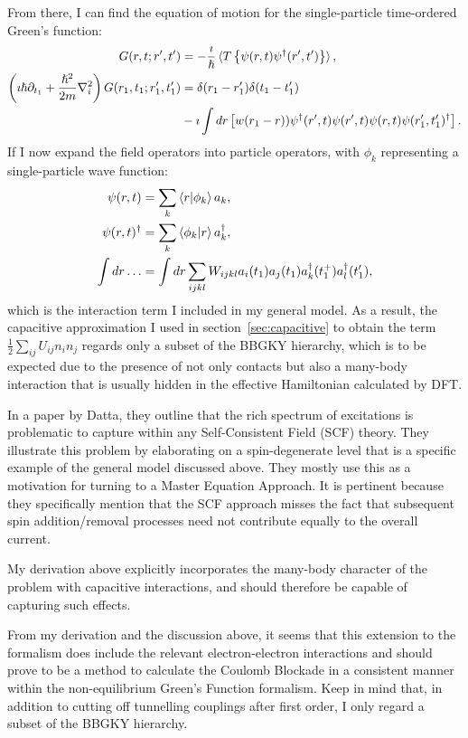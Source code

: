 From there, I can find the equation of motion for the single-particle time-ordered Green's function:
\begin{align*}
G(r,t;r^\prime,t^\prime) &= -\frac{\imath}{\hslash}\braket{T \left\{ \psi(r,t) \psi^\dagger(r^\prime,t^\prime)\right\}}, \\
\left(\imath\hslash\partial_{t_1} + \frac{\hslash^2}{2m}\nabla_i^2\right) G(r_1, t_1; r_1^\prime, t_1^\prime) &= \delta(r_1 - r_1^\prime) \delta(t_1 - t_1^\prime) \\&- \imath \int dr\left[w(r_1 - r) ) \psi^\dagger (r^\prime, t) \psi(r^\prime,t) \psi(r,t) \psi(r_1^\prime, t_1^\prime)^\dagger\right].
\end{align*}
If I now expand the field operators into particle operators, with $\phi_k$ representing a single-particle wave function:
\begin{align*}
\psi(r, t) &= \sum_k \braket{r|\phi_k} a_k,\\
\psi(r, t)^\dagger &= \sum_k \braket{\phi_k|r} a_k^\dagger,\\
\int dr\ldots &= \int dr \sum_{ijkl} W_{ijkl} a_i(t_1) a_j (t_1) a_k^\dagger(t_1^+) a_l^\dagger(t_1^\prime),
\end{align*} which is the interaction term I included in my general model. As a result, the capacitive approximation I used in section~\ref{sec:capacitive} to obtain the term $\frac{1}{2} \sum_{ij} U_{ij} n_i n_j$ regards only a subset of the BBGKY hierarchy, which is to be expected due to the presence of not only contacts but also a many-body interaction that is usually hidden in the effective Hamiltonian calculated by DFT.

In a paper by Datta\cite{mura}, they outline that the rich spectrum of excitations is problematic to capture within any Self-Consistent Field (SCF) theory. They illustrate this problem by elaborating on a spin-degenerate level that is a specific example of the general model discussed above. They mostly use this as a motivation for turning to a Master Equation Approach.  It is pertinent because they specifically mention that the SCF approach misses the fact that subsequent spin addition/removal processes need not contribute equally to the overall current. 

My derivation above explicitly incorporates the many-body character of the problem with capacitive interactions, and should therefore be capable of capturing such effects.

From my derivation and the discussion above, it seems that this extension to the formalism does include the relevant electron-electron interactions and should prove to be a method to calculate the Coulomb Blockade in a consistent manner within the non-equilibrium Green's Function formalism. Keep in mind that, in addition to cutting off tunnelling couplings after first order, I only regard a subset of the BBGKY hierarchy.



